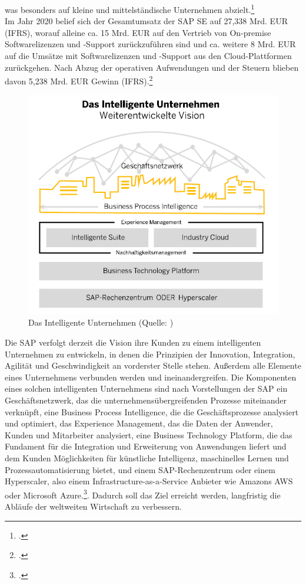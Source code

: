 was besonders auf kleine und mittelständische Unternehmen abzielt.\footcite[Vgl.][]{sap-historie}\\ Im Jahr 2020 belief sich der Gesamtumsatz der SAP SE auf 27,338 Mrd. EUR (IFRS), worauf alleine ca. 15 Mrd. EUR auf den Vertrieb von \glqq{}On-premise\grqq{} Softwarelizenzen und -Support zurückzuführen sind und ca. weitere 8 Mrd. EUR auf die Umsätze mit Softwarelizenzen und -Support aus den Cloud-Plattformen zurückgehen. Nach Abzug der operativen Aufwendungen und der Steuern blieben davon 5,238 Mrd. EUR Gewinn (IFRS).\footcite[Vgl.][S. 142]{sap2020-report} 

\begin{figure}[h!]
    \centering
    \includegraphics[scale=1]{Bilder/SAPIntelligentesUnternehmen.png}
    \caption[Das Intelligente Unternehmen]{Das Intelligente Unternehmen (Quelle: \cite[][S. 53]{sap2020-report})}
\end{figure}

Die SAP verfolgt derzeit die Vision ihre Kunden zu einem intelligenten Unternehmen zu entwickeln, in denen die Prinzipien der Innovation, Integration, Agilität und Geschwindigkeit an vorderster Stelle stehen. Außerdem alle Elemente eines Unternehmens verbunden werden und ineinandergreifen. Die Komponenten eines solchen intelligenten Unternehmens sind nach Vorstellungen der SAP ein Geschäftsnetzwerk, das die unternehmensübergreifenden Prozesse miteinander verknüpft, eine Business Process Intelligence, die die Geschäftsprozesse analysiert und optimiert, das Experience Management, das die Daten der Anwender, Kunden und Mitarbeiter analysiert, eine Business Technology Platform, die das Fundament für die Integration und Erweiterung von Anwendungen liefert und dem Kunden Möglichkeiten für künstliche Intelligenz, maschinelles Lernen und Prozessautomatisierung bietet, und einem SAP-Rechenzentrum oder einem Hyperscaler, also einem Infrastructure-as-a-Service Anbieter wie Amazons AWS oder Microsoft Azure.\footcite[Vgl.][S. 53 f.]{sap2020-report}. Dadurch soll das Ziel erreicht werden, langfristig die Abläufe der weltweiten Wirtschaft zu verbessern.


